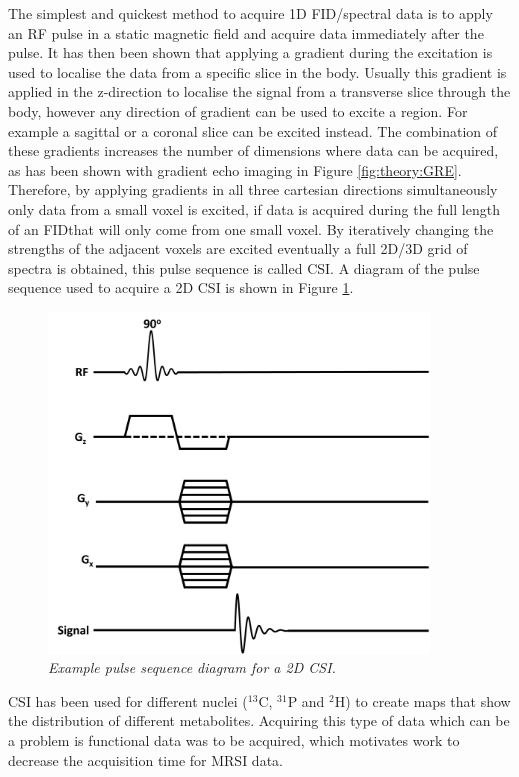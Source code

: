 The simplest and quickest method to acquire 1D \ac{FID}/spectral data is to apply an \ac{RF} pulse in a static magnetic field and acquire data immediately after the pulse. It has then been shown that applying a gradient during the excitation is used to localise the data from a specific slice in the body. Usually this gradient is applied in the z-direction to localise the signal from a transverse slice through the body, however any direction of gradient can be used to excite a region. For example a sagittal or a coronal slice can be excited instead. The combination of these gradients increases the number of dimensions where data can be acquired, as has been shown with gradient echo imaging in Figure \ref{fig:theory:GRE}. Therefore, by applying gradients in all three cartesian directions simultaneously only data from a small voxel is excited, if data is acquired during the full length of an \ac{FID}that will only come from one small voxel. By iteratively changing the strengths of the adjacent voxels are excited eventually a full 2D/3D grid of spectra is obtained, this pulse sequence is called \ac{CSI}. A diagram of the pulse sequence used to acquire a 2D \ac{CSI} is shown in Figure \ref{fig:theory:CSI}.

\begin{figure}[h]
    \centering
    \includegraphics[width=0.9\textwidth]{Figures/Theory/CSI_sequence.png}
    \caption{\textit{Example pulse sequence diagram for a 2D \ac{CSI}.}}
    \label{fig:theory:CSI}
\end{figure}

\ac{CSI} has been used for different nuclei ($^{13}$C, $^{31}$P and $^2$H) to create maps that show the distribution of different metabolites. Acquiring this type of data which can be a problem is functional data was to be acquired, which motivates work to decrease the acquisition time for \ac{MRSI} data.

